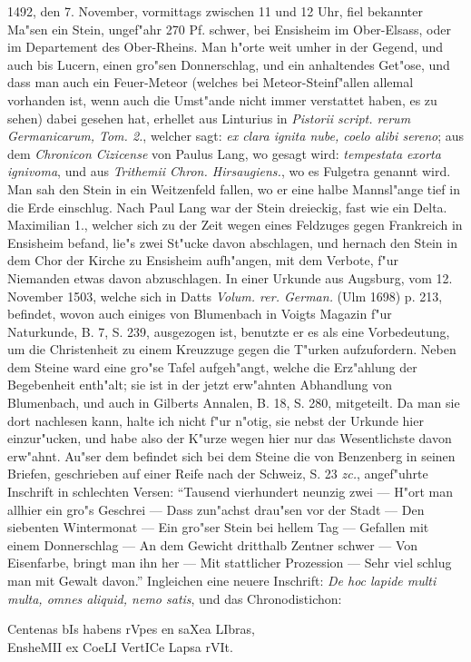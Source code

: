 \documentclass[a4paper, 11pt, oneside, polutonikogreek, german]{article}
\begin{document}
1492, den 7. November, vormittags zwischen 11 und 12 Uhr, fiel bekannter Ma"sen ein Stein, ungef"ahr 270 Pf. schwer, bei Ensisheim im Ober-Elsass, oder im Departement des Ober-Rheins. Man h"orte weit umher in der Gegend, und auch bis Lucern, einen gro"sen Donnerschlag, und ein anhaltendes Get"ose, und dass man auch ein Feuer-Meteor (welches bei Meteor-Steinf"allen allemal vorhanden ist, wenn auch die Umst"ande nicht immer verstattet haben, es zu sehen) dabei gesehen hat, erhellet aus Linturius in \emph{Pistorii script. rerum Germanicarum, Tom. 2.}, welcher sagt: \emph{ex clara ignita nube, coelo alibi sereno}; aus dem \emph{Chronicon Cizicense} von Paulus Lang, wo gesagt wird: \emph{tempestata exorta ignivoma}, und aus \emph{Trithemii Chron. Hirsaugiens.}, wo es Fulgetra genannt wird. Man sah den Stein in ein Weitzenfeld fallen, wo er eine halbe Mannsl"ange tief in die Erde einschlug. Nach Paul Lang war der Stein dreieckig, fast wie ein Delta. Maximilian 1., welcher sich zu der Zeit wegen eines Feldzuges gegen Frankreich in Ensisheim befand, lie"s zwei St"ucke davon abschlagen, und hernach den Stein in dem Chor der Kirche zu Ensisheim aufh"angen, mit dem Verbote, f"ur Niemanden etwas davon abzuschlagen. In einer Urkunde aus Augsburg, vom 12. November 1503, welche sich in Datts \emph{Volum. rer. German.} (Ulm 1698) p. 213, befindet, wovon auch einiges von Blumenbach in Voigts Magazin f"ur Naturkunde, B. 7, S. 239, ausgezogen ist, benutzte er es als eine Vorbedeutung, um die Christenheit zu einem Kreuzzuge gegen die T"urken aufzufordern. Neben dem Steine ward eine gro"se Tafel aufgeh"angt, welche die Erz"ahlung der Begebenheit enth"alt; sie ist in der jetzt erw"ahnten Abhandlung von Blumenbach, und auch in Gilberts Annalen, B. 18, S. 280, mitgeteilt. Da man sie dort nachlesen kann, halte ich nicht f"ur n"otig, sie nebst der Urkunde hier einzur"ucken, und habe also der K"urze wegen hier nur das Wesentlichste davon erw"ahnt. Au"ser dem befindet sich bei dem Steine die von Benzenberg in seinen Briefen, geschrieben auf einer Reife nach der Schweiz, S. 23 \emph{zc.}, angef"uhrte Inschrift in schlechten Versen: "`Tausend vierhundert neunzig zwei --- H"ort man allhier ein gro"s Geschrei --- Dass zun"achst drau"sen vor der Stadt --- Den siebenten Wintermonat --- Ein gro"ser Stein bei hellem Tag --- Gefallen mit einem Donnerschlag --- An dem Gewicht dritthalb Zentner schwer --- Von Eisenfarbe, bringt man ihn her --- Mit stattlicher Prozession --- Sehr viel schlug man mit Gewalt davon."' Ingleichen eine neuere Inschrift: \emph{De hoc lapide multi multa, omnes aliquid, nemo satis}, und das Chronodistichon:
\begin{center}
Centenas bIs habens rVpes en saXea LIbras,\\
EnsheMII ex CoeLI VertICe Lapsa rVIt.
\end{center}
\end{document}
